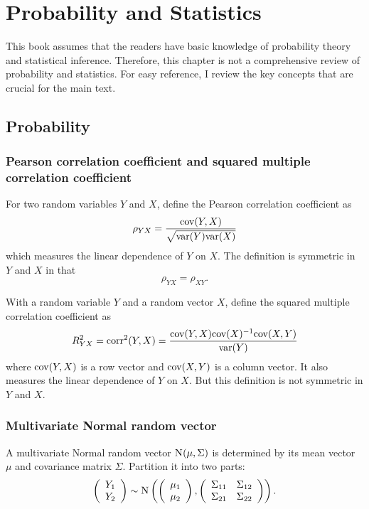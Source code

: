 
\chapter{Probability and Statistics}
 \label{chapter::basic-prob-append}
 
 
This book assumes that the readers have basic knowledge of probability theory and statistical inference. Therefore, this chapter is not a comprehensive review of probability and statistics. For easy reference, I review the key concepts that are crucial for the main text.  
 
 

\section{Probability}



\subsection{Pearson correlation coefficient and squared multiple correlation coefficient}
\label{sec::measure-pearson-r2}

For two random variables $Y$ and $X$, define the Pearson correlation coefficient as
$$
\rho_{YX} = \frac{  \textup{cov}(Y, X)  }{  \sqrt{  \textup{var}(Y)   \textup{var}(X) }   }
$$
which measures the linear dependence of $Y$ on $X$. The definition is symmetric in $Y$ and $X$ in that
$$
\rho_{YX}  = \rho_{XY} .
$$


With a random variable $Y$ and a random vector $X$, define the squared multiple correlation coefficient as
$$
R^2_{YX} = \textup{corr}^2(Y, X )
= \frac{   \textup{cov}(Y, X) \textup{cov}(X)^{-1} \textup{cov}(X, Y)  }{  \textup{var}(Y) }
$$
where $\textup{cov}(Y, X) $ is a row vector and $\textup{cov}(X, Y)$ is a column vector. It also measures the linear dependence of $Y$ on $X$. But this definition is not symmetric in $Y$ and $X$.



\subsection{Multivariate Normal random vector}
\label{sec::multivariate-normal}
 
A multivariate Normal random vector $\textsc{N}(\mu, \Sigma)$ is determined by its mean vector $\mu$ and covariance matrix $\Sigma$. Partition it into two parts: 
\[
\left(\begin{array}{c}
Y_{1}\\
Y_{2}
\end{array}\right)\sim\textsc{N}\left(\left(\begin{array}{c}
\mu_{1}\\
\mu_{2}
\end{array}\right),\left(\begin{array}{cc}
\Sigma_{11} & \Sigma_{12}\\
\Sigma_{21} & \Sigma_{22}
\end{array}\right)\right).
\]

